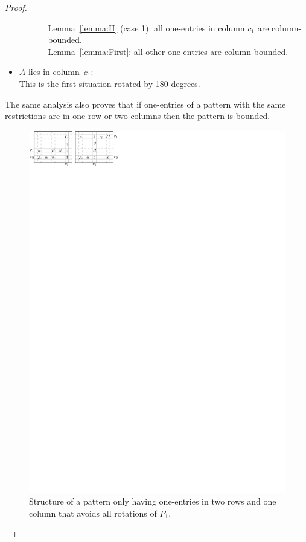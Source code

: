 \begin{proof}
\begin{itemize}
\begin{itemize}
\begin{itemize}
					Lemma~\ref{lemma:H} (case 1): all one-entries in column $c_1$ are column-bounded.\\
					Lemma~\ref{lemma:First}: all other one-entries are column-bounded.
			\end{itemize}
	\end{itemize}
\item $A$ lies in column~$c_1$:\\
	This is the first situation rotated by 180 degrees.
\end{itemize}
The same analysis also proves that if one-entries of a pattern with the same restrictions are in one row or two columns then the pattern is bounded.
\begin{figure}[!ht]
	\centering
	\includegraphics[width=120mm]{img/twoplusone.pdf}
	\caption{Structure of a pattern only having one-entries in two rows and one column that avoids all rotations of $P_1$.}
	\label{fig:twoplusone}
\end{figure}
\end{proof}

